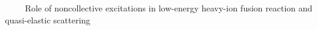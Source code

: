 \documentclass[12pt]{report}
\begin{document}
\begin{landscape}
\noindent
\pagestyle{empty}
\Huge{
}
\ \ \ \
\normalsize
Role of noncollective excitations in low-energy heavy-ion fusion reaction
and quasi-elastic scattering
\ \ \ \
\Huge{
}
\end{landscape}
\end{document}

